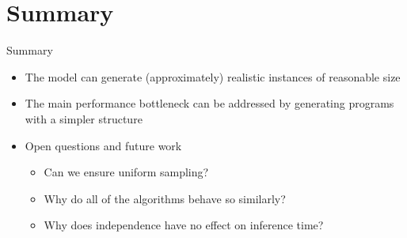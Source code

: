 \documentclass{beamer}
\begin{document}
\section{Summary}

\begin{frame}{Summary}
  \begin{itemize}
  \item The model can generate (approximately) realistic instances of reasonable
    size
  \item The main performance bottleneck can be addressed by generating programs
    with a simpler structure
  \item Open questions and future work
    \begin{itemize}
    \item Can we ensure uniform sampling?
    \item Why do all of the algorithms behave so similarly?
    \item Why does independence have no effect on inference time?
    \end{itemize}
  \end{itemize}
\end{frame}

\end{document}
